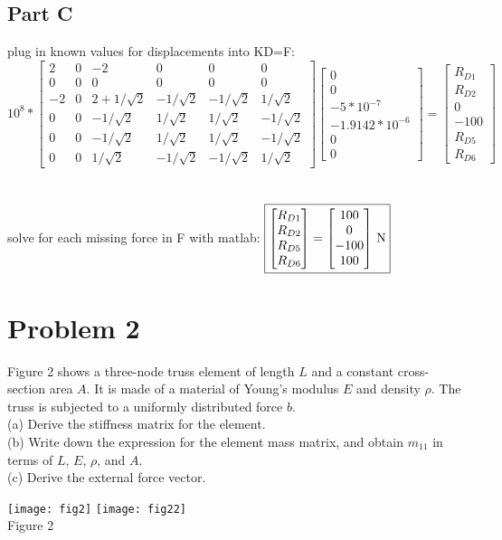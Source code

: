 \documentclass{article}
\begin{document}
\subsection*{Part C}
plug in known values for displacements into KD=F: \\
$10^8*\begin{bmatrix}
    2 & 0 & -2 & 0 & 0 & 0 \\
    0 & 0 & 0 & 0 & 0 & 0 \\
    -2 & 0 & 2+1/\sqrt{2} & -1/\sqrt{2} & -1/\sqrt{2} & 1/\sqrt{2} \\
    0 & 0 & -1/\sqrt{2} & 1/\sqrt{2} & 1/\sqrt{2} & -1/\sqrt{2} \\
    0 & 0 & -1/\sqrt{2} & 1/\sqrt{2} & 1/\sqrt{2} & -1/\sqrt{2} \\
    0 & 0 & 1/\sqrt{2} & -1/\sqrt{2} & -1/\sqrt{2} & 1/\sqrt{2}
\end{bmatrix}\begin{bmatrix}
    0 \\ 0 \\ -5*10^{-7} \\ -1.9142*10^{-6} \\ 0 \\ 0
\end{bmatrix}=\begin{bmatrix}
    R_{D1} \\ R_{D2} \\ 0 \\ -100 \\ R_{D5} \\ R_{D6}
\end{bmatrix}$ \\\\\\
solve for each missing force in F with matlab:
$\fbox{$\begin{bmatrix}
    R_{D1} \\ R_{D2} \\ R_{D5} \\ R_{D6}
\end{bmatrix}=\begin{bmatrix}
    100 \\ 0 \\ -100 \\ 100
\end{bmatrix}$ N}$

\section*{Problem 2}
Figure 2 shows a three-node truss element of length $L$ and a constant cross-section area
$A$. It is made of a material of Young’s modulus $E$ and density $\rho$. The truss is
subjected to a uniformly distributed force $b$. \\
(a) Derive the stiffness matrix for the element. \\
(b) Write down the expression for the element mass matrix, and obtain $m_{11}$ in terms of
$L$, $E$, $\rho$, and $A$. \\
(c) Derive the external force vector.
\begin{center}
    \texttt{[image: fig2]} \texttt{[image: fig22]} \\
    Figure 2
\end{center}
\end{document}
